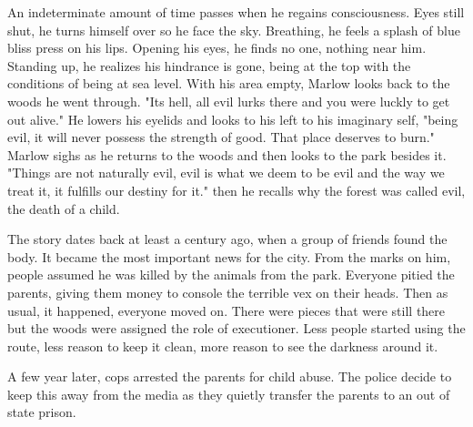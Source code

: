 		An indeterminate amount of time passes when he regains consciousness. Eyes still shut, he turns himself over so he face the sky. Breathing, he feels
	a splash of blue bliss press on his lips. Opening his eyes, he finds no one, nothing near him. Standing up, he realizes his hindrance is gone, being at the top
	with the conditions of being at sea level. With his area empty, Marlow looks back to the woods he went through. "Its hell, all evil lurks there and you were
	luckly to get out alive." He lowers his eyelids and looks to his left to his imaginary self, "being evil, it will never possess the strength of good. That
	place deserves to burn." Marlow sighs as he returns to the woods and then looks to the park besides it. "Things are not naturally evil, evil is what we deem
	to be evil and the way we treat it, it fulfills our destiny for it." then he recalls why the forest was called evil, the death of a child.

		The story dates back at least a century ago, when a group of friends found the body. It became the most important news for the city. From the marks
	on him, people assumed he was killed by the animals from the park. Everyone pitied the parents, giving them money to console the terrible vex on their heads.
	Then as usual, it happened, everyone moved on. There were pieces that were still there but the woods were assigned the role of executioner. Less people
	started using the route, less reason to keep it clean, more reason to see the darkness around it.
		
		A few year later, cops arrested the parents for child abuse. The police decide to keep this away from the media as they quietly transfer the parents
	to an out of state prison.

